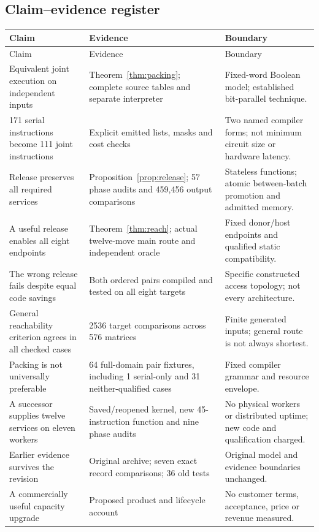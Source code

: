 \documentclass[11pt,letterpaper]{article}
\theoremstyle{definition}\newtheorem{definition}[theorem]{Definition}
\theoremstyle{remark}\newtheorem{remark}[theorem]{Remark}
\begin{document}
\subsection*{Claim--evidence register}
\begingroup\small
\begin{longtable}{@{}P{.28\linewidth}P{.34\linewidth}P{.31\linewidth}@{}}\toprule
Claim & Evidence & Boundary\\\midrule\endfirsthead
\toprule Claim & Evidence & Boundary\\\midrule\endhead
Equivalent joint execution on independent inputs & Theorem~\ref{thm:packing}; complete source tables and separate interpreter & Fixed-word Boolean model; established bit-parallel technique.\\[3pt]
171 serial instructions become 111 joint instructions & Explicit emitted lists, masks and cost checks & Two named compiler forms; not minimum circuit size or hardware latency.\\[3pt]
Release preserves all required services & Proposition~\ref{prop:release}; 57 phase audits and 459,456 output comparisons & Stateless functions; atomic between-batch promotion and admitted memory.\\[3pt]
A useful release enables all eight endpoints & Theorem~\ref{thm:reach}; actual twelve-move main route and independent oracle & Fixed donor/host endpoints and qualified static compatibility.\\[3pt]
The wrong release fails despite equal code savings & Both ordered pairs compiled and tested on all eight targets & Specific constructed access topology; not every architecture.\\[3pt]
General reachability criterion agrees in all checked cases & 2536 target comparisons across 576 matrices & Finite generated inputs; general route is not always shortest.\\[3pt]
Packing is not universally preferable & 64 full-domain pair fixtures, including 1 serial-only and 31 neither-qualified cases & Fixed compiler grammar and resource envelope.\\[3pt]
A successor supplies twelve services on eleven workers & Saved/reopened kernel, new 45-instruction function and nine phase audits & No physical workers or distributed uptime; new code and qualification charged.\\[3pt]
Earlier evidence survives the revision & Original archive; seven exact record comparisons; 36 old tests & Original model and evidence boundaries unchanged.\\[3pt]
A commercially useful capacity upgrade & Proposed product and lifecycle account & No customer terms, acceptance, price or revenue measured.\\\bottomrule
\end{longtable}
\endgroup
\end{document}
